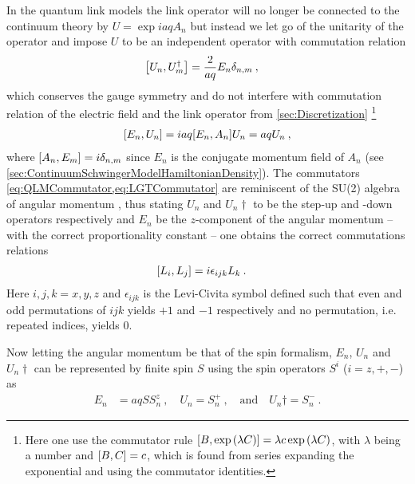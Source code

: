 \documentclass[../main.tex]{subfiles} %
\begin{document}
In the quantum link models the link operator will no longer be connected to the continuum theory by $U = \exp{iaqA_n}$ but instead we let go of the unitarity of the operator and impose $U$ to be an independent operator with commutation relation \cite{panyella_masterThesis_2019}
\begin{align} \label{eq:QLMCommutator}
    \commutator{U_n}{U_m\dagger} &= \frac{2}{aq} E_n \delta_{n,m} \: ,
\end{align}
which conserves the gauge symmetry and do not interfere with commutation relation of the electric field and the link operator from \cref{sec:Discretization} \cite{panyella_masterThesis_2019} \footnote{Here one use the commutator rule $\commutator{B}{\exp{\lambda C}} = \lambda c \exp{\lambda C} $, with $\lambda$ being a number and $\commutator{B}{C} = c$, which is found from series expanding the exponential and using the commutator identities.}
\begin{align} \label{eq:LGTCommutator}
    \commutator{E_n}{U_n} = iaq \commutator{E_n}{A_n} U_n = aq U_n \: ,
\end{align}
where $\commutator{A_n}{E_m} = i \delta_{n,m}$ since $E_n$ is the conjugate momentum field of $A_n$ (see \cref{sec:ContinuumSchwingerModelHamiltonianDensity}). The commutators \cref{eq:QLMCommutator,eq:LGTCommutator} are reminiscent of the SU(2) algebra of angular momentum \cite{Barros_GaugeTheoriesWithUltracoldAtoms_2020, widmer_PhD_2dQuantumLinkModels_2015}, thus stating $U_n$ and $U_n\dagger$ to be the step-up and -down operators respectively and $E_n$ be the $z$-component of the angular momentum -- with the correct proportionality constant -- one obtains the correct commutations relations
\begin{align}
    \commutator{L_i}{L_j} &= i \epsilon_{ijk}L_k \: .
\end{align}
Here $i,j,k = x,y,z$ and $\epsilon_{ijk}$ is the Levi-Civita symbol defined such that even and odd permutations of $ijk$ yields $+1$ and $-1$ respectively and no permutation, i.e. repeated indices, yields $0$.

Now letting the angular momentum be that of the spin formalism, $E_n$, $U_n$ and $U_n\dagger$ can be represented by finite spin $S$ using the spin operators $S^i$ ($i=z,+,-$) as
\begin{align} \label{eq:QuantumLinkModel}
    E_n &= aq S S_n^z \: , \quad
    U_n = S_n^+ \: , \quad \text{and} \quad
    U_n\dagger = S_n^- \: .
\end{align}
\end{document}
